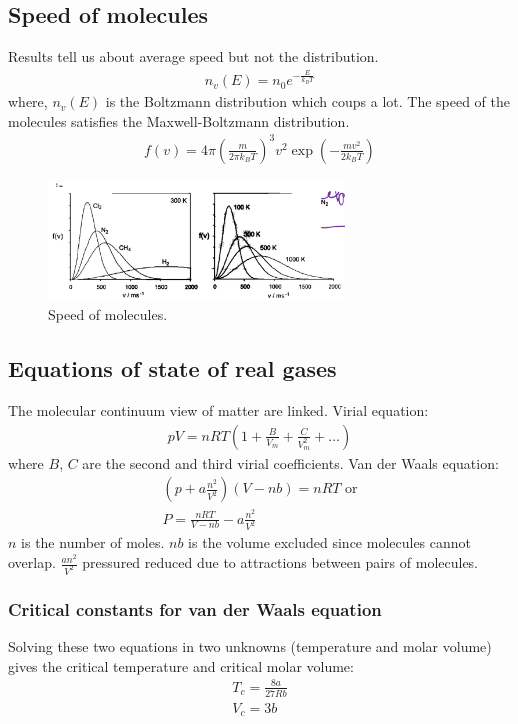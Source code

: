 \subsection{Speed of molecules}
Results tell us about average speed but not the distribution.
\begin{gather}
	n_v\left(E\right) = n_0 e^{-\frac{E}{k_B T}}
\end{gather}
where, $n_v\left(E\right)$ is the Boltzmann distribution which coups a lot. The speed of the molecules satisfies the Maxwell-Boltzmann distribution.
\begin{gather}
	f\left(v\right) = 4\pi \left(\frac{m}{2\pi k_B T}\right)^3 v^2 \exp{\left(-\frac{mv^2}{2k_B T}\right)}
\end{gather}
\begin{figure}[H]
	\centering
	\includegraphics[width = 0.7\textwidth]{./img/figure17.png}
	\caption{Speed of molecules.}
\end{figure}
\subsection{Equations of state of real gases}
The molecular continuum view of matter are linked. Virial equation:
\begin{gather}
	pV = nRT\left(1 + \frac{B}{V_m} + \frac{C}{V_m^2} + \dots\right)
\end{gather}
where $B$, $C$ are the second and third virial coefficients. Van der Waals equation:
\begin{gather}
	\left(p + a\frac{n^2}{V^2}\right)\left(V - nb\right) = nRT \textrm{ or}\\
	P = \frac{nRT}{V- nb} - a \frac{n^2}{V^2}
\end{gather}
$n$ is the number of moles. $nb$ is the volume excluded since molecules cannot overlap. $\frac{an^2}{V^2}$ pressured reduced due to attractions between pairs of molecules.
\subsubsection{Critical constants for van der Waals equation}
Solving these two equations in two unknowns (temperature and molar volume) gives the critical temperature and critical molar volume:
\begin{gather}
	T_c = \frac{8a}{27Rb}\\
	V_c = 3b
\end{gather}
